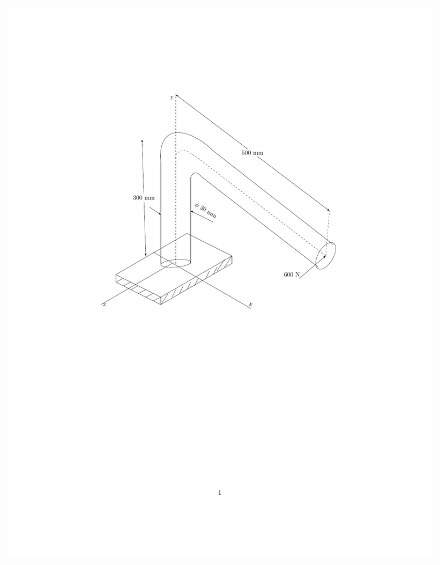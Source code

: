 \documentclass[journal,12pt,onecolumn,article]{IEEEtran}
\theoremstyle{remark}
\begin{document}
\begin{enumerate}
		\begin{figure}[H]
	\centering
	\includegraphics[width=0.7\linewidth]{figs/fig80/main.pdf}
\end{figure}
\vspace{-150pt}


\end{enumerate}
\end{document}
